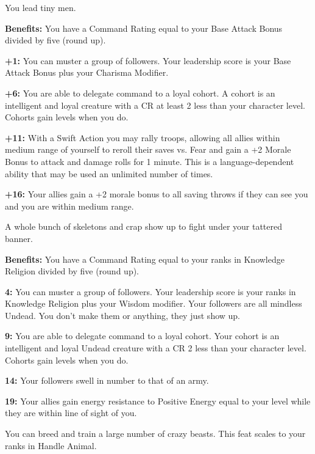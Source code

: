 
You lead tiny men.

\textbf{Benefits:} You have a Command Rating equal to your Base Attack Bonus divided by five (round up).

\textbf{+1:} You can muster a group of followers. Your leadership score is your Base Attack Bonus plus your Charisma Modifier.

\textbf{+6:} You are able to delegate command to a loyal cohort. A cohort is an intelligent and loyal creature with a CR at least 2 less than your character level. Cohorts gain levels when you do.

\textbf{+11:} With a Swift Action you may rally troops, allowing all allies within medium range of yourself to reroll their saves vs. Fear and gain a +2 Morale Bonus to attack and damage rolls for 1 minute. This is a language-dependent ability that may be used an unlimited number of times.

\textbf{+16:} Your allies gain a +2 morale bonus to all saving throws if they can see you and you are within medium range.


A whole bunch of skeletons and crap show up to fight under your tattered banner.

\textbf{Benefits:} You have a Command Rating equal to your ranks in Knowledge Religion divided by five (round up).

\textbf{4:} You can muster a group of followers. Your leadership score is your ranks in Knowledge Religion plus your Wisdom modifier. Your followers are all mindless Undead. You don't make them or anything, they just show up.

\textbf{9:} You are able to delegate command to a loyal cohort. Your cohort is an intelligent and loyal Undead creature with a CR 2 less than your character level. Cohorts gain levels when you do.

\textbf{14:} Your followers swell in number to that of an army.

\textbf{19:} Your allies gain energy resistance to Positive Energy equal to your level while they are within line of sight of you.


You can breed and train a large number of crazy beasts. This feat scales to your ranks in Handle Animal.

